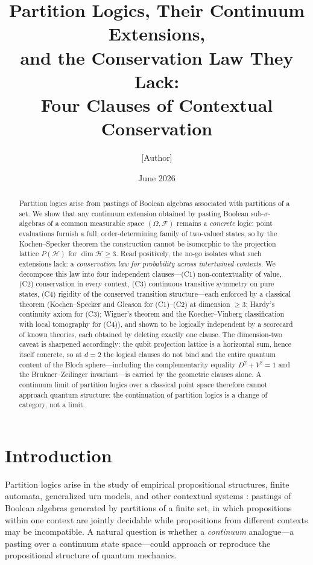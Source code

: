 \documentclass[11pt]{article}
\title{Partition Logics, Their Continuum Extensions,\\
and the Conservation Law They Lack:\\
\large Four Clauses of Contextual Conservation}
\author{[Author]}
\date{June 2026}
\theoremstyle{definition}
\theoremstyle{remark}
\newcommand{\Hi}{\mathcal{H}}
\newcommand{\PH}{P(\Hi)}
\newcommand{\F}{\mathcal{F}}
\newcommand{\Om}{\Omega}
\begin{document}
\maketitle

\begin{abstract}
Partition logics arise from pastings of Boolean algebras associated with
partitions of a set. We show that any continuum extension obtained by
pasting Boolean sub-$\sigma$-algebras of a common measurable space
$(\Om,\F)$ remains a \emph{concrete} logic: point evaluations furnish a
full, order-determining family of two-valued states, so by the
Kochen--Specker theorem the construction cannot be isomorphic to the
projection lattice $\PH$ for $\dim\Hi\ge 3$. Read positively, the no-go
isolates what such extensions lack: a \emph{conservation law for
probability across intertwined contexts}. We decompose this law into
four independent clauses---(C1) non-contextuality of value, (C2)
conservation in every context, (C3) continuous transitive symmetry on
pure states, (C4) rigidity of the conserved transition structure---each
enforced by a classical theorem (Kochen--Specker and Gleason for
(C1)--(C2) at dimension $\geq 3$; Hardy's continuity axiom for (C3);
Wigner's theorem and the Koecher--Vinberg classification with local
tomography for (C4)), and shown to be logically independent by a
scorecard of known theories, each obtained by deleting exactly one
clause. The dimension-two caveat is sharpened accordingly: the qubit
projection lattice is a horizontal sum, hence itself concrete, so at
$d=2$ the logical clauses do not bind and the entire quantum content of
the Bloch sphere---including the complementarity equality
$D^{2}+V^{2}=1$ and the Brukner--Zeilinger invariant---is carried by the
geometric clauses alone. A continuum limit of partition logics over a
classical point space therefore cannot approach quantum structure: the
continuation of partition logics is a change of category, not a limit.
\end{abstract}

\section{Introduction}

Partition logics arise in the study of empirical propositional structures,
finite automata, generalized urn models, and other contextual systems
\cite{Svozil1998,FoulisRandall1972,Wright1990,Svozil2005}: pastings of
Boolean algebras generated by partitions of a finite set, in which
propositions within one context are jointly decidable while propositions
from different contexts may be incompatible. A natural question is
whether a \emph{continuum} analogue---a pasting over a continuum state
space---could approach or reproduce the propositional structure of
quantum mechanics.
\end{document}
